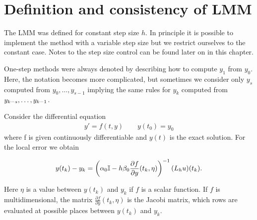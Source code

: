 \section{Definition and consistency of LMM}



\begin{remark}
   The LMM was defined for constant step size
  $h$.  In principle it is possible to implement the method with a
  variable step size but we restrict ourselves to the constant case.
  Notes to the step size control can be found later on in this chapter.
\end{remark}

\begin{remark}
  One-step methods were always denoted by describing how to compute
  $y_1$ from $y_0$. Here, the notation becomes more complicated, but
  sometimes we consider only $y_s$ computed from $y_0,\dots,y_{s-1}$
  implying the same rules for $y_k$ computed from
  $y_{k-s},\dots,y_{k-1}$.
\end{remark}


\begin{lemma}
  Consider the differential equation
  \begin{gather*}
    y' = f(t,y) \qquad y(t_0) = y_0
  \end{gather*}
  where f is given continuously differentiable and $y(t)$ is the exact solution.
  For the local error we obtain

  \begin{gather}
    y(t_k)-y_k = \left( \alpha_0 \mathbb I - h\beta_0 \frac{\partial f}{\partial y}(t_k,\eta) \right)^{-1} (L_h u)(t_k).
  \end{gather}

  Here $\eta$ is a value between $y(t_k)$ and $y_k$ if $f$ is a scalar
	function.
  If $f$ is multidimensional, the matrix 
	$\frac{\partial f}{\partial y}(t_k,\eta)$ is the Jacobi matrix, 
	which rows are evaluated at possible places between
	$y(t_k)$ and $y_k$.
\end{lemma}


